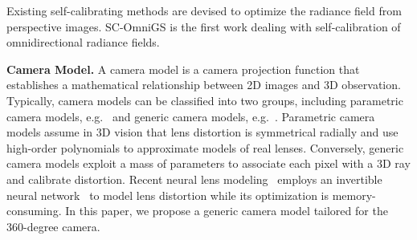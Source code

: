 Existing self-calibrating methods are devised to optimize the radiance field from perspective images. SC-OmniGS is the first work dealing with self-calibration of omnidirectional radiance fields.

\textbf{Camera Model.} A camera model is a camera projection function that establishes a mathematical relationship between 2D images and 3D observation. Typically, camera models can be classified into two groups, including parametric camera models, e.g.~\citep{camera_model:kd, camera_model:ds} and generic camera models, e.g.~\citep{camera_model:dist, camera_model:having}. Parametric camera models assume in 3D vision that lens distortion is symmetrical radially and use high-order polynomials to approximate models of real lenses. Conversely, generic camera models exploit a mass of parameters to associate each pixel with a 3D ray and calibrate distortion. Recent neural lens modeling~\citep{camera_model:nlm} employs an invertible neural network~\citep{FrEIA} to model lens distortion while its optimization is memory-consuming. 
In this paper, we propose a generic camera model tailored for the 360-degree camera.





